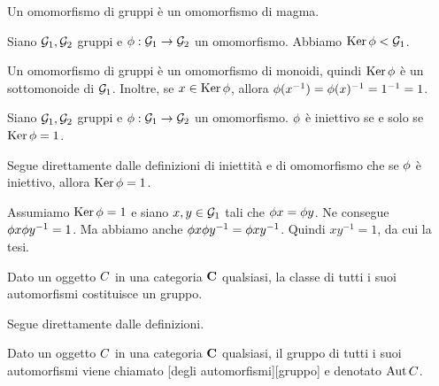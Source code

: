 \Proof Un omomorfismo di gruppi \`e un omomorfismo di magma. \EndProof
\begin{Theorem}
	Siano $\mathcal{G}_1, \mathcal{G}_2$ gruppi e $\phi: \mathcal{G}_1 \rightarrow \mathcal{G}_2$ un omomorfismo. Abbiamo $\operatorname{Ker}{\phi} < \mathcal{G}_1$.
\end{Theorem}
\Proof Un omomorfismo di gruppi \`e un omomorfismo di monoidi, quindi $\operatorname{Ker}{\phi}$ \`e un sottomonoide di $\mathcal{G}_1$. Inoltre, se $x \in \operatorname{Ker}{\phi}$, allora $\phi(x^{-1}) = \phi(x)^{-1} = 1^{-1} = 1$. \EndProof
\begin{Theorem}
	Siano $\mathcal{G}_1, \mathcal{G}_2$ gruppi e
	$\phi: \mathcal{G}_1 \rightarrow \mathcal{G}_2$ un omomorfismo.
	$\phi$ \`e iniettivo se e solo se
	$\operatorname{Ker}{\phi} = 1$.
\end{Theorem}
\Proof
Segue direttamente dalle definizioni di iniettit\`a e di omomorfismo che
se $\phi$ \`e iniettivo, allora
$\operatorname{Ker}{\phi} = 1$.
\par
Assumiamo $\operatorname{Ker}{\phi} = 1$ e siano $x, y \in \mathcal{G}_1$ tali che
$\phi{x} = \phi{y}$.
Ne consegue $\phi{x}\phi{y}^{-1} = 1$.
Ma abbiamo anche $\phi{x}\phi{y}^{-1} =
\phi{xy^{-1}}$.
Quindi $xy^{-1} = 1$, da cui la tesi.
\EndProof
\begin{Theorem}
	Dato un oggetto $C$ in una categoria $\mathbf{C}$ qualsiasi, la classe di tutti i suoi automorfismi costituisce un gruppo.
\end{Theorem}
\Proof Segue direttamente dalle definizioni. \EndProof
\begin{Definition}
	Dato un oggetto $C$ in una categoria $\mathbf{C}$ qualsiasi, il gruppo di tutti i suoi automorfismi viene chiamato [degli automorfismi][gruppo] e denotato $\operatorname{Aut}{C}$.
\end{Definition}
